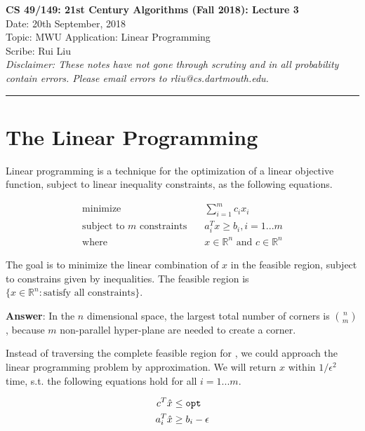 \documentclass[11pt]{article}
\begin{document}
\begin{center}
    {\bf \Large CS 49/149: 21st Century Algorithms (Fall 2018): Lecture 3}\\ 
    Date: 20th September, 2018 \\
    Topic: MWU Application: Linear Programming \\
    Scribe: Rui Liu \\
    {\em Disclaimer: These notes have not gone through scrutiny and in all probability contain errors. Please email errors to rliu@cs.dartmouth.edu.}
\end{center}

\hrule height 2pt
\vspace{3ex}
\def\loss{\mathsf{loss}}

\section{The Linear Programming}
Linear programming is a technique for the optimization of a linear objective function, subject to linear inequality constraints, as the following equations.

\begin{equation}
\begin{aligned}
    \text{minimize} \quad & \sum_{i=1}^m c_i x_i \\
    \text{subject to $m$ constraints} \quad & a_i^T x \geq b_i, i=1...m \\
    \text{where} \quad & x \in \mathbb{R}^n \text{ and } c\in \mathbb{R}^n
\end{aligned}
\end{equation}

The goal is to minimize the linear combination of $x$ in the feasible region, subject to constrains given by inequalities.
The feasible region is $\{ x\in \mathbb{R}^n: \text{satisfy all constraints} \}$.

\textbf{Answer}: In the $n$ dimensional space, the largest total number of corners is $\binom{n}{m}$, because $m$ non-parallel hyper-plane are needed to create a corner.

Instead of traversing the complete feasible region for \opt, we could approach the linear programming problem by approximation.
We will return $\hat{x}$ within $1/\epsilon^2$ time, s.t. the following equations hold for all $i=1...m$.

\begin{align*}
c^T\hat{x} &\leq {\tt opt} \\
a_i^T \hat{x} &\geq b_i - \epsilon
\end{align*}
\end{document}
